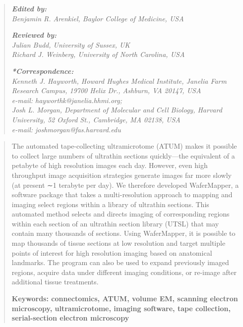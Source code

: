 \documentclass{article}
\begin{document}
\begin{quote}\small
\noindent\textbf{\emph{Edited by:}}\\
\emph{Benjamin R. Arenkiel, Baylor College of Medicine, USA}

\noindent\textbf{\emph{Reviewed by:}}\\
\emph{Julian Budd, University of Sussex, UK}\\
\emph{Richard J. Weinberg, University of North Carolina, USA}

\noindent\textbf{\emph{*Correspondence:}}\\
\emph{Kenneth J. Hayworth, Howard Hughes Medical Institute, Janelia Farm Research Campus, 19700 Helix Dr., Ashburn, VA 20147, USA\\ e-mail: hayworthk@janelia.hhmi.org;\\ Josh L. Morgan, Department of Molecular and Cell Biology, Harvard University, 52 Oxford St., Cambridge, MA 02138, USA\\ e-mail: joshmorgan@fas.harvard.edu}
\end{quote}

\begin{quote}
The automated tape-collecting ultramicrotome (ATUM) makes it possible to collect large numbers of ultrathin sections quickly—the equivalent of a petabyte of high resolution images each day. However, even high throughput image acquisition strategies generate images far more slowly (at present ∼1 terabyte per day). We therefore developed WaferMapper, a software package that takes a multi-resolution approach to mapping and imaging select regions within a library of ultrathin sections. This automated method selects and directs imaging of corresponding regions within each section of an ultrathin section library (UTSL) that may contain many thousands of sections. Using WaferMapper, it is possible to map thousands of tissue sections at low resolution and target multiple points of interest for high resolution imaging based on anatomical landmarks. The program can also be used to expand previously imaged regions, acquire data under different imaging conditions, or re-image after additional tissue treatments.

\noindent\textbf{Keywords: connectomics, ATUM, volume EM, scanning electron microscopy, ultramicrotome, imaging software, tape collection, serial-section electron microscopy}
\end{quote}
\end{document}
